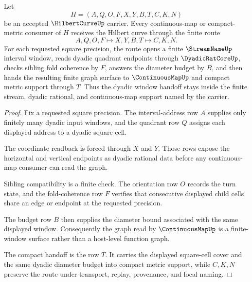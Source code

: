 \begin{theorem}
\label{thm:hilbert-curve-finite-window-continuity}
Let
$$
H=(A,Q,O,F,X,Y,B,T,C,K,N)
$$
be an accepted $\HilbertCurveUp$ carrier. Every continuous-map or compact-metric consumer of $H$ receives the Hilbert curve through the finite route
$$
A,Q,O,F \longmapsto X,Y,B,T \longmapsto C,K,N .
$$
For each requested square precision, the route opens a finite $\StreamNameUp$ interval window, reads dyadic quadrant endpoints through $\DyadicRatCoreUp$, checks sibling fold coherence by $F$, answers the diameter budget by $B$, and then hands the resulting finite graph surface to $\ContinuousMapUp$ and compact metric support through $T$. Thus the dyadic window handoff stays inside the finite stream, dyadic rational, and continuous-map support named by the carrier.
\end{theorem}
\begin{proof}
Fix a requested square precision. The interval-address row $A$ supplies only finitely many dyadic input windows, and the quadrant row $Q$ assigns each displayed address to a dyadic square cell.

The coordinate readback is forced through $X$ and $Y$. Those rows expose the horizontal and vertical endpoints as dyadic rational data before any continuous-map consumer can read the graph.

Sibling compatibility is a finite check. The orientation row $O$ records the turn state, and the fold-coherence row $F$ verifies that consecutive displayed child cells share an edge or endpoint at the requested precision.

The budget row $B$ then supplies the diameter bound associated with the same displayed window. Consequently the graph read by $\ContinuousMapUp$ is a finite-window surface rather than a host-level function graph.

The compact handoff is the row $T$. It carries the displayed square-cell cover and the same dyadic diameter budget into compact metric support, while $C,K,N$ preserve the route under transport, replay, provenance, and local naming.
\end{proof}


